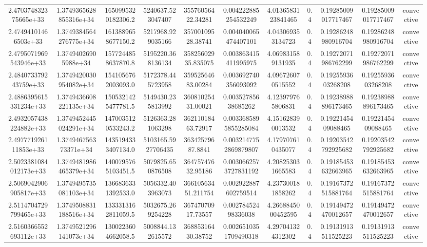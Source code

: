 \begin{table}
\begin{tabular}{ccccccccccc}
2.470374832375665e+33 & 1.3749365628855316e+34 & 1650995320182306.2 & 5240637.523047407 & 35576056422.34281 & 0.004222885254532249 & 4.0136583123841465 & 0.4 & 0.19285009017717467 & 0.19285009017717467 & convective \\
2.47494101466503e+33 & 1.3749384564276775e+34 & 1613889658677150.2 & 5217968.929035166 & 35700109528.38741 & 0.004040065474407101 & 4.043069353134723 & 0.4 & 0.19286248980916704 & 0.19286248980916704 & convective \\
2.4795071969543946e+33 & 1.37494026905988e+34 & 1577244858637870.8 & 5195220.368136134 & 35825602935.835075 & 0.003863415411995975 & 4.069831589131935 & 0.4 & 0.19272071986762299 & 0.19272071986762299 & convective \\
2.484073379243759e+33 & 1.3749420030954082e+34 & 1541056762003093.0 & 5172378.445723958 & 35952564683.00284 & 0.003692740356093092 & 4.096726070515552 & 0.4 & 0.1925593603268208 & 0.1925593603268208 & convective \\
2.4886395615331234e+33 & 1.3749436608221135e+34 & 1505321425477781.5 & 5149430.235813992 & 36081025431.00021 & 0.00352785638685262 & 4.123979765806831 & 0.4 & 0.19238988896173465 & 0.19238988896173465 & convective \\
2.4932057438224882e+33 & 1.3749452445024291e+34 & 1470035120533243.2 & 5126363.281063298 & 36211018463.72917 & 0.0033685895855285084 & 4.151628390013532 & 0.4 & 0.1922145409088465 & 0.1922145409088465 & convective \\
2.497771926111853e+33 & 1.374946756373371e+34 & 1435194333407134.0 & 5103165.5927706435 & 36342579687.8841 & 0.0032147752869879807 & 4.179707610435077 & 0.4 & 0.19203542792925682 & 0.19203542792925682 & convective \\
2.5023381084012173e+33 & 1.3749481986465379e+34 & 1400795765103451.5 & 5079825.650876508 & 36475747632.95186 & 0.0030662573727831192 & 4.208253031665583 & 0.4 & 0.19185453632663965 & 0.19185453632663965 & convective \\
2.5069042906905817e+33 & 1.3749495735081103e+34 & 1366836331392533.0 & 5056332.403963073 & 36610563451.211754 & 0.002922887602759514 & 4.237300181858262 & 0.4 & 0.19167372515881764 & 0.19167372515881764 & convective \\
2.5114704729799465e+33 & 1.3749508831188516e+34 & 1333313162811059.5 & 5032675.269254228 & 36747070917.73557 & 0.00278452498336038 & 4.2668845000452595 & 0.4 & 0.19149472470012657 & 0.19149472470012657 & convective \\
2.5160366552693112e+33 & 1.3749521296141073e+34 & 1300223604662058.5 & 5008844.132615572 & 36885316430.38752 & 0.0026510351709490318 & 4.297041324312302 & 0.4 & 0.19131913511525223 & 0.19131913511525223 & convective \\

\end{tabular}
\end{table}
